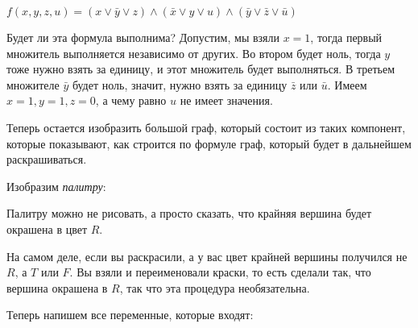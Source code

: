\documentclass[russian]{lecture-notes}
\theoremstyle{definition}
\begin{document}
		\begin{example*}
			$f(x, y, z, u) = (x \vee \bar{y} \vee z) \wedge (\bar{x} \vee y \vee u) \wedge (\bar{y} \vee \bar{z} \vee \bar{u})$
			
			Будет ли эта формула выполнима? Допустим, мы взяли $ x = 1 $, тогда первый множитель выполняется независимо от других.
			Во втором будет ноль, тогда $ y $ тоже нужно взять за единицу, и этот множитель будет выполняться. В третьем множителе $ \bar{y} $ будет ноль, значит, нужно взять за единицу $ \bar{z} $ или $ \bar{u} $. Имеем $x=1, y=1, z=0$, а чему равно $u$ не имеет значения. 
			
			Теперь остается изобразить большой граф, который состоит из таких компонент, которые показывают, как строится по формуле граф, который будет в дальнейшем раскрашиваться.  
			
			Изобразим {\em палитру}:
			
			\begin{figure} [H]
				\centering
			\end{figure}
			
			Палитру можно не рисовать, а просто сказать, что крайняя вершина будет окрашена в цвет $ R $.
			
			На самом деле, если вы раскрасили, а у вас цвет крайней вершины получился не $ R $, а $ T $ или $F$. Вы взяли и переименовали краски, то есть сделали так, что вершина окрашена в $ R $, так что эта процедура необязательна. 
			
			Теперь напишем все переменные, которые входят:
			
			\begin{figure} [H]
				\centering
\end{figure}
\end{example*}
\end{document}
